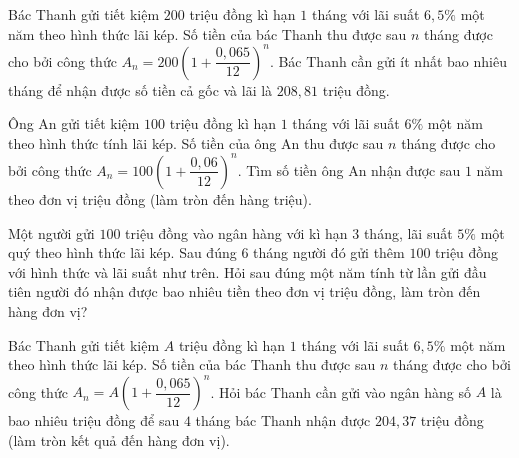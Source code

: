 \begin{ex}%
	Bác Thanh gửi tiết kiệm $200$ triệu đồng kì hạn $1$ tháng với lãi suất $6{,}5\%$ một năm theo hình thức lãi kép. Số tiền của bác Thanh thu được sau $n$ tháng được cho bởi  công thức $A_n=200\left( 1+\dfrac{0{,}065}{12} \right)^n$. Bác Thanh cần gửi ít nhất bao nhiêu tháng để nhận được số tiền cả gốc và lãi là $208{,}81$ triệu đồng.
\end{ex}

\begin{ex}%
	Ông An gửi tiết kiệm $100$ triệu đồng kì hạn $1$ tháng với lãi suất $6\%$ một năm theo hình thức tính lãi  kép. Số tiền của ông An thu được sau $n$ tháng được cho bởi công thức $A_n=100\left(1+\dfrac{0{,}06}{12} \right)^n$. Tìm số tiền ông An nhận được sau $1$ năm theo đơn vị triệu đồng (làm tròn đến hàng triệu).
\end{ex}

\begin{ex}%
	Một người gửi $100$ triệu đồng vào ngân hàng với kì hạn $3$ tháng, lãi suất $5\%$ một quý theo hình thức lãi kép. Sau đúng $6$ tháng người đó gửi thêm $100$ triệu đồng với  hình thức và lãi suất như trên. Hỏi sau đúng một năm tính từ lần gửi đầu tiên người đó nhận được bao nhiêu tiền theo đơn vị triệu đồng, làm tròn đến hàng đơn vị?
\end{ex}

\begin{ex}%
	Bác Thanh gửi tiết kiệm $A$ triệu đồng kì hạn $1$ tháng với lãi suất $6{,}5\%$ một năm theo hình thức lãi kép. Số tiền của bác  Thanh thu được sau $n$ tháng được cho bởi công thức $A_n=A\left( 1+\dfrac{0{,}065}{12} \right)^n$. Hỏi bác Thanh cần gửi vào ngân hàng số $A$ là bao nhiêu triệu đồng để sau $4$ tháng bác Thanh nhận được $204{,}37$ triệu đồng (làm tròn kết quả đến hàng đơn vị).
\end{ex}

